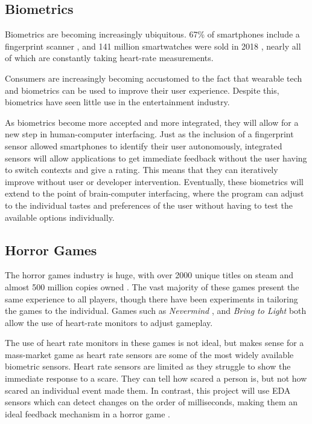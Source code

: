 \documentclass[12pt,a4paper]{article}\usepackage[]{graphicx}\usepackage[]{color}
\begin{document}
\subsection{Biometrics}
Biometrics are becoming increasingly ubiquitous. 67\% of smartphones include a fingerprint scanner \citet{fingerprint}, and 141 million smartwatches were sold in 2018 \citet{smartwatches}, nearly all of which are constantly taking heart-rate measurements.

Consumers are increasingly becoming accustomed to the fact that wearable tech and biometrics can be used to improve their user experience. Despite this, biometrics have seen little use in the entertainment industry.

As biometrics become more accepted and more integrated, they will allow for a new step in human-computer interfacing. Just as the inclusion of a fingerprint sensor allowed smartphones to identify their user autonomously, integrated sensors will allow applications to get immediate feedback without the user having to switch contexts and give a rating. This means that they can iteratively improve without user or developer intervention. Eventually, these biometrics will extend to the point of brain-computer interfacing, where the program can adjust to the individual tastes and preferences of the user without having to test the available options individually.

\subsection{Horror Games}
The horror games industry is huge, with over 2000 unique titles on steam and almost 500 million copies owned \citet{horrorSteamSpy}. The vast majority of these games present the same experience to all players, though there have been experiments in tailoring the games to the individual. Games such as  \emph{Nevermind} \citet{nevermind}, and \emph{Bring to Light} \citet{bringtolight} both allow the use of heart-rate monitors to adjust gameplay.

The use of heart rate monitors in these games is not ideal, but makes sense for a mass-market game as heart rate sensors are some of the most widely available biometric sensors. Heart rate sensors are limited as they struggle to show the immediate response to a scare. They can tell how scared a person is, but not how scared an individual event made them. In contrast, this project will use EDA sensors which can detect changes on the order of milliseconds, making them an ideal feedback mechanism in a horror game \citet{edaAnalysis}.
\end{document}
